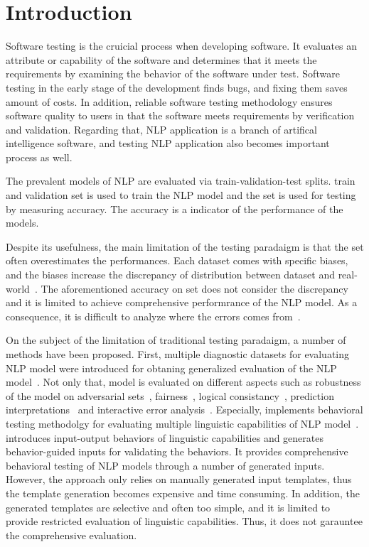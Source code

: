 \section{Introduction}
\label{sec:intro}

Software testing is the cruicial process when developing software.  It
evaluates an attribute or capability of the software and determines
that it meets the requirements by examining the behavior of the
software under test. Software testing in the early stage of the
development finds bugs, and fixing them saves amount of costs. In
addition, reliable software testing methodology ensures software
quality to users in that the software meets requirements by
verification and validation. Regarding that, NLP application is a branch
of artifical intelligence software, and testing NLP application
also becomes important process as well.

The prevalent models of NLP are evaluated via train-validation-test
splits. train and validation set is used to train the NLP model and
the \ho set is used for testing by measuring accuracy. The accuracy is
a indicator of the performance of the models.

Despite its usefulness, the main limitation of the testing paradaigm
is that the \ho set often overestimates the performances. Each dataset
comes with specific biases, and the biases increase the discrepancy of
distribution between dataset and
real-world~\cite{recht2019imagenetbias}. The aforementioned accuracy
on \ho set does not consider the discrepancy and it is limited to
achieve comprehensive performrance of the NLP model. As a consequence,
it is difficult to analyze where the errors comes
from~\cite{wu2019errudite}.

On the subject of the limitation of traditional testing paradaigm, a
number of methods have been proposed. First, multiple diagnostic
datasets for evaluating NLP model were introduced for obtaning
generalized evaluation of the NLP model~\cite{wang2018glue}. Not only
that, model is evaluated on different aspects such as robustness of
the model on adversarial
sets~\cite{ribeiro2018sear,belinkov2018breaknmt,
  rychalska2019wildnlp,iyyer2018adversarial},
fairness~\cite{prabhakaran2019fairness,rottger2020hatecheck}, logical
consistancy~\cite{ribeiro2019consistencyeval}, prediction
interpretations~\cite{ribeiroSG16lime} and interactive error
analysis~\cite{wu2019errudite}. Especially, \Chlst implements
behavioral testing methodolgy for evaluating multiple linguistic
capabilities of NLP model~\cite{marcoACL2020checklist}. \Chlst
introduces input-output behaviors of linguistic capabilities and
generates behavior-guided inputs for validating the behaviors. It
provides comprehensive behavioral testing of NLP models through a
number of generated inputs. However, the approach only relies on
manually generated input templates, thus the template generation
becomes expensive and time consuming. In addition, the generated
templates are selective and often too simple, and it is limited to
provide restricted evaluation of linguistic capabilities. Thus, it
does not garauntee the comprehensive evaluation.

